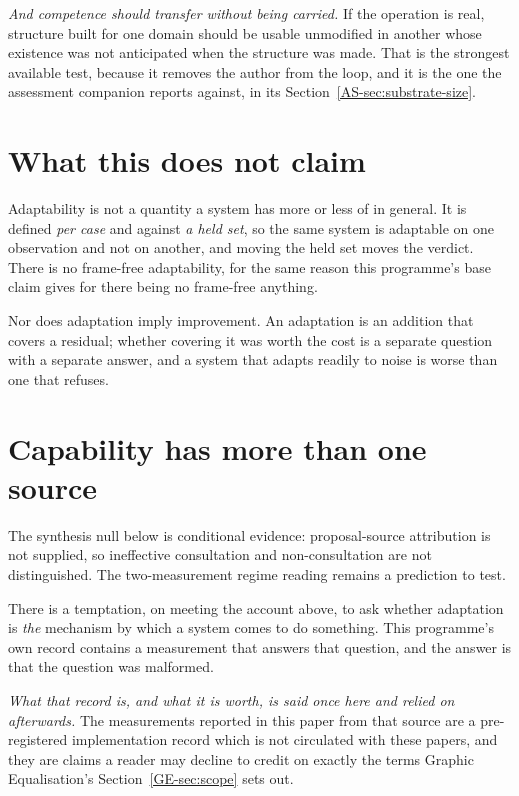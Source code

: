 \documentclass[11pt,a4paper]{article}
\theoremstyle{remark}
\begin{document}
\emph{And competence should transfer without being carried.} If the operation is real, structure built
for one domain should be usable unmodified in another whose existence was not anticipated when the
structure was made. That is the strongest available test, because it removes the author from the loop,
and it is the one the assessment companion reports against, in its
Section~\ref{AS-sec:substrate-size}.

\section{What this does not claim}\label{sec:not-claimed}
Adaptability is not a quantity a system has more or less of in general. It is defined \emph{per case}
and against \emph{a held set}, so the same system is adaptable on one observation and not on another,
and moving the held set moves the verdict. There is no frame-free adaptability, for the same reason
this programme's base claim gives for there being no frame-free anything.

Nor does adaptation imply improvement. An adaptation is an addition that covers a residual; whether
covering it was worth the cost is a separate question with a separate answer, and a system that adapts
readily to noise is worse than one that refuses.

\section{Capability has more than one source}\label{sec:counter}
The synthesis null below is conditional evidence: proposal-source attribution
is not supplied, so ineffective consultation and non-consultation are not
distinguished. The two-measurement regime reading remains a prediction to test.

There is a temptation, on meeting the account above, to ask whether adaptation is \emph{the} mechanism
by which a system comes to do something. This programme's own record contains a measurement that
answers that question, and the answer is that the question was malformed.

\emph{What that record is, and what it is worth, is said once here and relied on afterwards.} The
measurements reported in this paper from that source are a pre-registered implementation record which
is not circulated with these papers, and they are claims a reader may decline to credit on exactly the
terms Graphic Equalisation's Section~\ref{GE-sec:scope} sets out.
\end{document}
